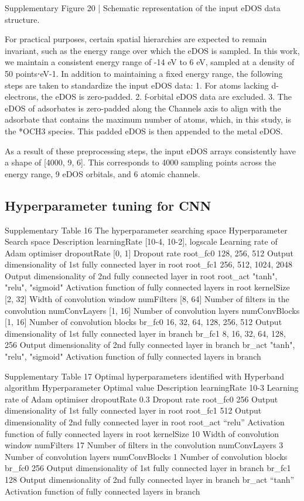 Supplementary Figure 20 | Schematic representation of the input eDOS data structure.

For practical purposes, certain spatial hierarchies are expected to remain invariant, such as the energy range over which the eDOS is sampled. In this work, we maintain a consistent energy range of -14 eV to 6 eV, sampled at a density of 50 points⋅eV-1. In addition to maintaining a fixed energy range, the following steps are taken to standardize the input eDOS data:
1.	For atoms lacking d-electrons, the eDOS is zero-padded.
2.	f-orbital eDOS data are excluded.
3.	The eDOS of adsorbates is zero-padded along the Channels axis to align with the adsorbate that contains the maximum number of atoms, which, in this study, is the *OCH3 species. This padded eDOS is then appended to the metal eDOS.

As a result of these preprocessing steps, the input eDOS arrays consistently have a shape of [4000, 9, 6]. This corresponds to 4000 sampling points across the energy range, 9 eDOS orbitals, and 6 atomic channels.


\subsection{Hyperparameter tuning for CNN}

Supplementary Table 16
The hyperparameter searching space
Hyperparameter	Search space	Description
learningRate	[10-4, 10-2], logscale	Learning rate of Adam optimiser
dropoutRate	[0, 1]	Dropout rate
root_fc0	128, 256, 512	Output dimensionality of 1st fully connected layer in root
root_fc1	256, 512, 1024, 2048	Output dimensionality of 2nd fully connected layer in root
root_act	"tanh", "relu", "sigmoid"	Activation function of fully connected layers in root
kernelSize	[2, 32]	Width of convolution window
numFilters	[8, 64]	Number of filters in the convolution
numConvLayers	[1, 16]	Number of convolution layers
numConvBlocks	[1, 16]	Number of convolution blocks
br_fc0	16, 32, 64, 128, 256, 512	Output dimensionality of 1st fully connected layer in branch
br_fc1	8, 16, 32, 64, 128, 256	Output dimensionality of 2nd fully connected layer in branch
br_act	"tanh", "relu", "sigmoid"	Activation function of fully connected layers in branch


Supplementary Table 17
Optimal hyperparameters identified with Hyperband algorithm
Hyperparameter	Optimal value	Description
learningRate	10-3	Learning rate of Adam optimiser
dropoutRate	0.3	Dropout rate
root_fc0	256	Output dimensionality of 1st fully connected layer in root
root_fc1	512	Output dimensionality of 2nd fully connected layer in root
root_act	“relu”	Activation function of fully connected layers in root
kernelSize	10	Width of convolution window
numFilters	17	Number of filters in the convolution
numConvLayers	3	Number of convolution layers
numConvBlocks	1	Number of convolution blocks
br_fc0	256	Output dimensionality of 1st fully connected layer in branch
br_fc1	128	Output dimensionality of 2nd fully connected layer in branch
br_act	“tanh”	Activation function of fully connected layers in branch


